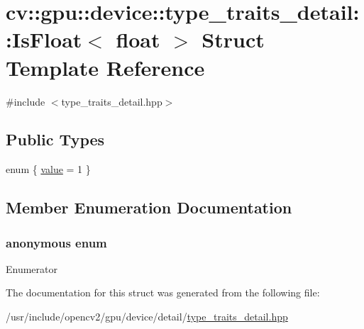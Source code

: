 \hypertarget{structcv_1_1gpu_1_1device_1_1type__traits__detail_1_1IsFloat_3_01float_01_4}{\section{cv\-:\-:gpu\-:\-:device\-:\-:type\-\_\-traits\-\_\-detail\-:\-:Is\-Float$<$ float $>$ Struct Template Reference}
\label{structcv_1_1gpu_1_1device_1_1type__traits__detail_1_1IsFloat_3_01float_01_4}
}


{\ttfamily \#include $<$type\-\_\-traits\-\_\-detail.\-hpp$>$}

\subsection*{Public Types}
\begin{DoxyCompactItemize}
\item 
enum \{ \hyperlink{structcv_1_1gpu_1_1device_1_1type__traits__detail_1_1IsFloat_3_01float_01_4_a0e8f4e48124b7baaf727323d1c2f90d6a3838ef0ffb66e02318d32dd40e9bfb4d}{value} = 1
 \}
\end{DoxyCompactItemize}


\subsection{Member Enumeration Documentation}
\hypertarget{structcv_1_1gpu_1_1device_1_1type__traits__detail_1_1IsFloat_3_01float_01_4_a0e8f4e48124b7baaf727323d1c2f90d6}{\subsubsection[{anonymous enum}]{\setlength{\rightskip}{0pt plus 5cm}anonymous enum}}\label{structcv_1_1gpu_1_1device_1_1type__traits__detail_1_1IsFloat_3_01float_01_4_a0e8f4e48124b7baaf727323d1c2f90d6}
\begin{Desc}
\item[Enumerator]\par
\begin{description}
\item[{\em 
\hypertarget{structcv_1_1gpu_1_1device_1_1type__traits__detail_1_1IsFloat_3_01float_01_4_a0e8f4e48124b7baaf727323d1c2f90d6a3838ef0ffb66e02318d32dd40e9bfb4d}{value}\label{structcv_1_1gpu_1_1device_1_1type__traits__detail_1_1IsFloat_3_01float_01_4_a0e8f4e48124b7baaf727323d1c2f90d6a3838ef0ffb66e02318d32dd40e9bfb4d}
}]\end{description}
\end{Desc}


The documentation for this struct was generated from the following file\-:\begin{DoxyCompactItemize}
\item 
/usr/include/opencv2/gpu/device/detail/\hyperlink{type__traits__detail_8hpp}{type\-\_\-traits\-\_\-detail.\-hpp}\end{DoxyCompactItemize}
